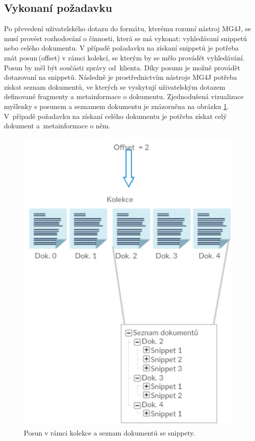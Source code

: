\subsection*{Vykonaní požadavku}
\label{SearchForSnpts}
Po převedení uživatelského dotazu do formátu, kterému rozumí nástroj MG4J, se musí provést rozhodování o činnosti, která se má vykonat: vyhledávaní snippetů nebo celého dokumentu. V případě požadavku na získaní snippetů je potřeba znát  posun\,(offset) v rámci kolekcí, se kterým by se mělo provádět vyhledávání. Posun by měl být součásti zprávy od~klienta. Díky posunu je možně provádět dotazovaní na  snippetů. Následně je prostřednictvím nástroje MG4J potřeba získat seznam dokumentů, ve kterých se vyskytují  uživatelským dotazem definované fragmenty a metainformace o dokumentu. Zjednodušená vizualizace myšlenky s posunem a seznamem dokumentu je znázorněna na  obrázku \ref{ListOdDocumentsLblLbl}. V~případě požadavku na získaní celého dokumentu je potřeba získat celý dokument a~metainformace o něm.


\begin{figure}[ht]
\begin{center}
	\includegraphics[scale=0.5]{obrazky-figures/OffsetInCollection.png}
\end{center}
	\caption{Posun v rámci kolekce a seznam dokumentů se snippety.}
    \label{ListOdDocumentsLblLbl}
\end{figure}


